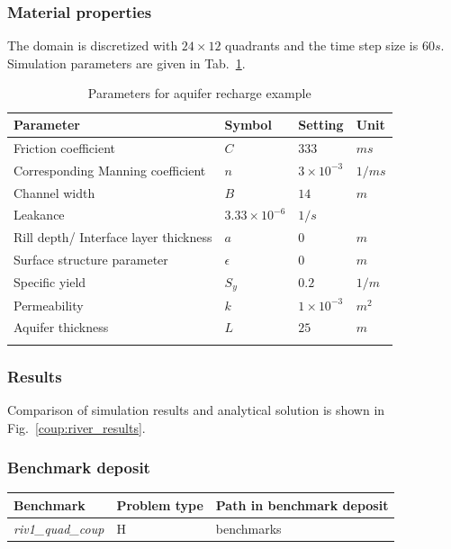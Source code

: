 \subsubsection*{Material properties}
%
The domain is discretized with $24\times 12$ quadrants and the time step size is $60s$.
Simulation parameters are given in Tab.~\ref{Coup_ChannelPercolation}.
%
\begin{table}[H]
 \centering
 \caption{Parameters for aquifer recharge example}
 \centering \label{Coup_ChannelPercolation}
 \begin{tabular}{llll}
 \hline\hline\noalign{\smallskip}
 {\bf Parameter} & {\bf Symbol} & {\bf Setting} & {\bf Unit} \\ \hline
 Friction coefficient & $C$ & $333$ & $ms$ \\
 Corresponding Manning coefficient & $n$ & $3\times 10^{-3}$ & $1/ms$ \\
 Channel width & $B$ & $14$ & $m$ \\
 Leakance & $3.33\times 10^{-6}$ & $1/s$ & \\
 Rill depth/ Interface layer thickness & $a$ & $0$ & $m$ \\
 Surface structure parameter & $\epsilon$ & $0$ & $m$  \\
 Specific yield  & $S_y$ & $0.2$ & $1/m$ \\
 Permeability  & $k$ & $1\times 10^{-3}$ & $m^2$\\
 Aquifer thickness & $L$ & $25$ & $m$ \\ \hline
\noalign{\smallskip}\hline\hline
 \end{tabular}
\end{table}
%
\subsubsection*{Results}
%
Comparison of simulation results and analytical solution is shown in Fig.~\ref{coup:river_results}.
%
\subsubsection*{Benchmark deposit}
%
\begin{tabular}{|l|l|l|}
  \hline
  Benchmark & Problem type & Path in benchmark deposit \\
  \hline
  \emph{riv1\_quad\_coup} & H & benchmarks\verb \COUPLED_FLOW\ \\
 \hline
\end{tabular}
%
%

